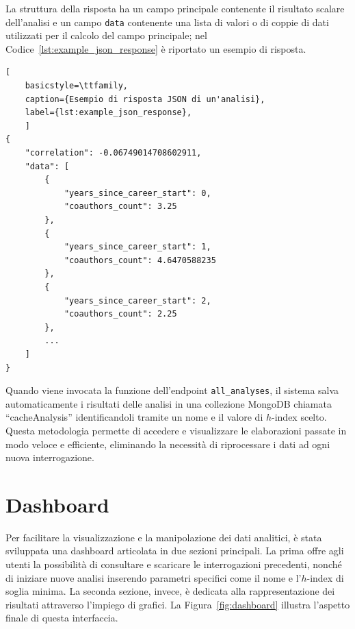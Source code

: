 La struttura della risposta ha un campo principale contenente il risultato scalare dell'analisi e un campo \texttt{data} contenente una lista di valori o di coppie di dati utilizzati per il calcolo del campo principale; nel Codice~\ref{lst:example_json_response} è riportato un esempio di risposta.

\begin{lstfloat}
    \begin{lstlisting}[
    basicstyle=\ttfamily,
    caption={Esempio di risposta JSON di un'analisi},
    label={lst:example_json_response},
    ]
{
    "correlation": -0.06749014708602911,
    "data": [
        {
            "years_since_career_start": 0,
            "coauthors_count": 3.25
        },
        {
            "years_since_career_start": 1, 
            "coauthors_count": 4.6470588235
        },
        {
            "years_since_career_start": 2,
            "coauthors_count": 2.25
        },
        ...
    ]
}
    \end{lstlisting}
\end{lstfloat}

Quando viene invocata la funzione dell'endpoint \texttt{all\_analyses}, il sistema salva automaticamente i risultati delle analisi in una collezione MongoDB chiamata ``cacheAnalysis'' identificandoli tramite un nome e il valore di $h$-index scelto. Questa metodologia permette di accedere e visualizzare le elaborazioni passate in modo veloce e efficiente, eliminando la necessità di riprocessare i dati ad ogni nuova interrogazione.

\section{Dashboard}
Per facilitare la visualizzazione e la manipolazione dei dati analitici, è stata sviluppata una dashboard articolata in due sezioni principali. La prima offre agli utenti la possibilità di consultare e scaricare le interrogazioni precedenti, nonché di iniziare nuove analisi inserendo parametri specifici come il nome e l'$h$-index di soglia minima. La seconda sezione, invece, è dedicata alla rappresentazione dei risultati attraverso l'impiego di grafici. La Figura~\ref{fig:dashboard} illustra l'aspetto finale di questa interfaccia.

